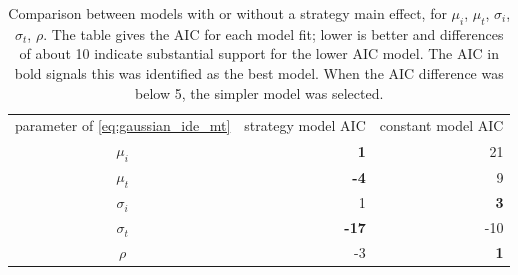 \documentclass[acmlarge, manuscript,review]{acmart}
\begin{document}
\begin{table}[htbp]
  \centering
  \caption{Comparison between models with or without a strategy main effect, for $\mu_i$, $\mu_t$, $\sigma_i$, $\sigma_t$, $\rho$. The table gives the AIC for each model fit; lower is better and differences of about 10 indicate substantial support for the lower AIC model. The AIC in bold signals this was identified as the best model. When the AIC difference was below 5, the simpler model was selected.}
  \label{tab:aic_gop}
  \begin{tabular}{c rr}
    parameter of \autoref{eq:gaussian_ide_mt}   & strategy model AIC & constant model AIC\\
    $\mu_i$ &  \textbf{1} & 21 \\
    $\mu_t$ & \textbf{-4} & 9 \\
    $\sigma_i$ & 1 & \textbf{3} \\
    $\sigma_t$ & \textbf{-17} & -10 \\
    $\rho$ &  -3& \textbf{1} \\
  \end{tabular}
\end{table}
\end{document}
